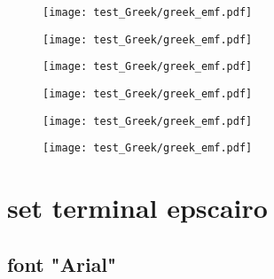 \documentclass{ltjsarticle}
\begin{document}
			\begin{figure}[ht]
				\centering
				\begin{minipage}{0.3\columnwidth}
					\texttt{[image: test\_Greek/greek\_emf.pdf]}
				\end{minipage}
				\begin{minipage}{0.3\columnwidth}
					\texttt{[image: test\_Greek/greek\_emf.pdf]}
				\end{minipage}
				\begin{minipage}{0.3\columnwidth}
					\texttt{[image: test\_Greek/greek\_emf.pdf]}
				\end{minipage}
				\begin{minipage}{0.3\columnwidth}
					\texttt{[image: test\_Greek/greek\_emf.pdf]}
				\end{minipage}
				\begin{minipage}{0.3\columnwidth}
					\texttt{[image: test\_Greek/greek\_emf.pdf]}
				\end{minipage}
				\begin{minipage}{0.3\columnwidth}
					\texttt{[image: test\_Greek/greek\_emf.pdf]}
				\end{minipage}
			\end{figure}
			\clearpage%

	\section{set terminal epscairo}

		\subsection{font "Arial"}
\end{document}
